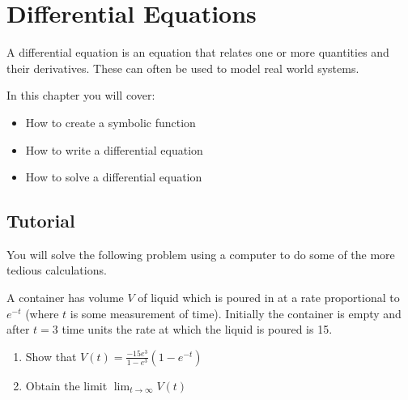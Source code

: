 \chapter{Differential Equations}
\label{chp:differential_equations}

A differential equation is an equation that relates one or more quantities and
their derivatives. These can often be used to model real world systems.

\begin{note}
In this chapter you will cover:
\begin{itemize}
\item 

How to create a symbolic function

\item 

How to write a differential equation

\item 

How to solve a differential equation

\end{itemize}
\end{note}





\section{Tutorial}
\label{\detokenize{tools-for-mathematics/09-differential-equations/tutorial/main:tutorial}}\label{\detokenize{tools-for-mathematics/09-differential-equations/tutorial/main::doc}}

You will solve the following problem using a computer to do some of the more
tedious calculations.




A container has volume \(V\) of liquid which is poured in at a rate proportional
to \(e^{-t}\) (where \(t\) is some measurement of time). Initially the container is empty and
after \(t=3\) time units the rate at which the liquid is poured is 15.
\begin{enumerate}

\item 

Show that \(V(t)=\frac{-15e^{3}}{1-e^{3}}(1 - e^{-t})\)

\item 

Obtain the limit \(\lim_{t\to \infty}V(t)\)

\end{enumerate}



